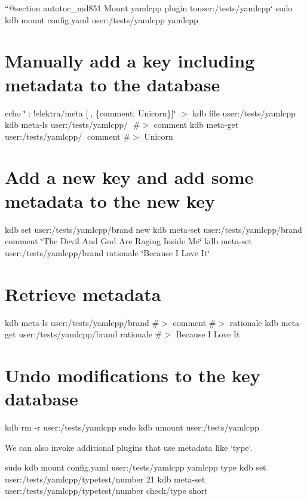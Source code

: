``{\ttfamily  @section autotoc\+\_\+md851 Mount yamlcpp plugin to}user\+:/tests/yamlcpp` sudo kdb mount config.\+yaml user\+:/tests/yamlcpp yamlcpp\hypertarget{autotoc_md807_autotoc_md852}{}\section{Manually add a key including metadata to the database}\label{autotoc_md807_autotoc_md852}
echo \char`\"{}🔑\+: !elektra/meta \mbox{[}🦄, \{comment\+: Unicorn\}\mbox{]}\char`\"{} $>$ {\ttfamily kdb file user\+:/tests/yamlcpp} kdb meta-\/ls user\+:/tests/yamlcpp/🔑 \#$>$ comment kdb meta-\/get user\+:/tests/yamlcpp/🔑 comment \#$>$ Unicorn\hypertarget{autotoc_md807_autotoc_md853}{}\section{Add a new key and add some metadata to the new key}\label{autotoc_md807_autotoc_md853}
kdb set user\+:/tests/yamlcpp/brand new kdb meta-\/set user\+:/tests/yamlcpp/brand comment \char`\"{}\+The Devil And God Are Raging Inside Me\char`\"{} kdb meta-\/set user\+:/tests/yamlcpp/brand rationale \char`\"{}\+Because I Love It\char`\"{}\hypertarget{autotoc_md807_autotoc_md854}{}\section{Retrieve metadata}\label{autotoc_md807_autotoc_md854}
kdb meta-\/ls user\+:/tests/yamlcpp/brand \#$>$ comment \#$>$ rationale kdb meta-\/get user\+:/tests/yamlcpp/brand rationale \#$>$ Because I Love It\hypertarget{autotoc_md807_autotoc_md855}{}\section{Undo modifications to the key database}\label{autotoc_md807_autotoc_md855}
kdb rm -\/r user\+:/tests/yamlcpp sudo kdb umount user\+:/tests/yamlcpp 
\begin{DoxyCode}
We can also invoke additional plugins that use metadata like `type`.
\end{DoxyCode}
 sudo kdb mount config.\+yaml user\+:/tests/yamlcpp yamlcpp type kdb set user\+:/tests/yamlcpp/typetest/number 21 kdb meta-\/set user\+:/tests/yamlcpp/typetest/number check/type short

